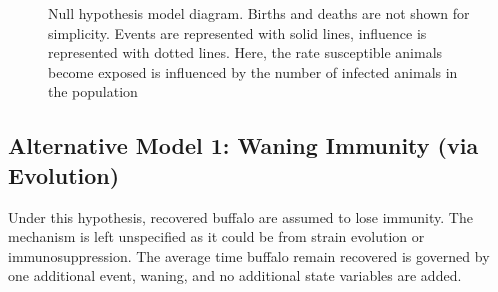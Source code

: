 \documentclass{article}
\begin{document}
\begin{figure}[H]
  \centering
  \caption{Null hypothesis model diagram. Births and deaths are not shown for simplicity. Events are represented with solid lines, influence is represented with dotted lines.  Here, the rate susceptible animals become exposed is influenced by the number of infected animals in the population}
  \label{fig:diagram1}
\end{figure}


\subsection{Alternative Model 1: Waning Immunity (via Evolution)}
Under this hypothesis, recovered buffalo are assumed to lose immunity.  The mechanism is left unspecified as it could be from strain evolution or immunosuppression. The average time buffalo remain recovered is governed by one additional event, waning, and no additional state variables are added. 
\end{document}
